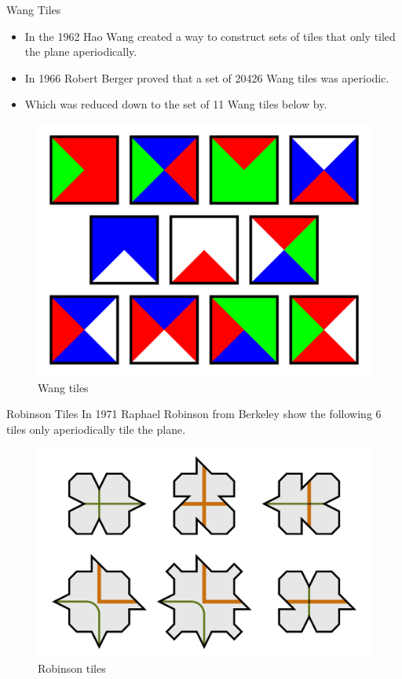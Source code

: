 \documentclass{beamer}
\begin{document}
\begin{frame}{Wang Tiles}
    \begin{itemize}
        \item In the 1962 Hao Wang created a way to construct sets of tiles that only tiled the plane aperiodically.
        \item In 1966 Robert Berger proved that a set of 20426 Wang tiles was aperiodic. \cite{berger1966undecidability}
        \item Which was reduced down to the set of 11 Wang tiles below by\cite{Jeandel2021aperiodic}.
    \end{itemize}
    
    \begin{figure}
        \centering
        \includegraphics[width=0.4\linewidth]{images/other-tiles/Wang_11_tiles.svg.png}
        \caption{Wang tiles\cite{wang11tiles}}
        \label{fig:wang-tiles}
    \end{figure}
\end{frame}

\begin{frame}{Robinson Tiles}
    In 1971 Raphael Robinson from Berkeley show the following 6 tiles only aperiodically tile the plane.\cite{robinson1971}
    \begin{figure}
        \centering
        \includegraphics[width=0.5\linewidth]{images/other-tiles/Robinson_tiles.svg.png}
        \caption{Robinson tiles\cite{robinsontiles}}
        \label{fig:robinson-tile}
    \end{figure}
\end{frame}
\end{document}
